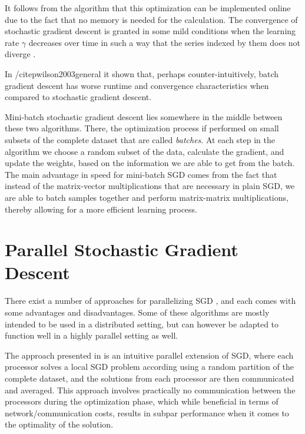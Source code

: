 \documentclass[11pt,a4paper]{article}
\begin{document}
It follows from the algorithm that this optimization can be implemented online due to the fact that 
no memory is needed for the calculation. The convergence of stochastic gradient descent is granted in 
some mild conditions when the learning rate $\gamma$ decreases over time in such a way that the series 
indexed by them does not diverge \citep{bottou2010large}. 

In /citep{wilson2003general} it shown that, perhaps counter-intuitively, batch gradient descent has worse runtime
and convergence characteristics when compared to stochastic gradient descent.

Mini-batch stochastic gradient descent lies somewhere in the middle between these two algorithms. There, the optimization
process if performed on small subsets of the complete dataset that are called \textit{batches}. At each step in the algorithm
we choose a random subset of the data, calculate the gradient, and update the weights, based on the information we are able
to get from the batch. The main advantage in speed for mini-batch SGD comes from the fact that instead of the matrix-vector
multiplications that are necessary in plain SGD, we are able to batch samples together and perform matrix-matrix
multiplications, thereby allowing for a more efficient learning process.

\section{Parallel Stochastic Gradient Descent}

There exist a number of approaches for parallelizing SGD \citep{zinkevich2010parallelized, recht2011hogwild, dekel2012optimal},
and each comes with some advantages and disadvantages. Some of these algorithms are mostly intended to be used in a distributed setting,
but can however be adapted to function well in a highly parallel setting as well.

The approach presented in \cite{zinkevich2010parallelized} is an
intuitive parallel extension of SGD, where each processor solves a local SGD problem according using a random partition
of the complete dataset, and the solutions from each processor are then communicated and averaged. This approach involves
practically no communication between the processors during the optimization phase, which while beneficial in terms of
network/communication costs, results in subpar performance when it comes to the optimality of the solution.
 
\end{document}
